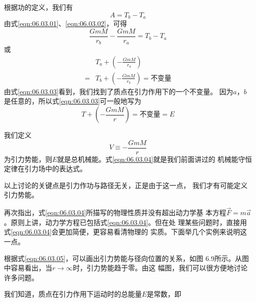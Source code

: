 \clearpage
根据功的定义，我们有
\begin{equation}\label{eqn:06.03.02}
  A = T _ { b } - T _ { a }
\end{equation}
由式\eqref{eqn:06.03.01}、\eqref{eqn:06.03.02}，可得
\begin{equation*}
  \frac { G m M } { r _ { b } } - \frac { G m M } { r _ { a } } = T _ { b } - T _ { a }
\end{equation*}
或
\begin{equation}\label{eqn:06.03.03}
  \begin{aligned}
      & T _ { a } + \left( - \frac { G m M } { r _ { a } } \right)              \\
    = & T _ { b } + \left( - \frac { G m M } { r _ { b } } \right) = \text{不变量}
  \end{aligned}
\end{equation}
由式\eqref{eqn:06.03.03}看到，我们找到了质点在引力作用下的一个不变量。
因为$ a $，$ b $是任意的，所以式\eqref{eqn:06.03.03}可一般地写为
\begin{equation}\label{eqn:06.03.04}
  T + \left( - \frac { G m M } { r } \right) = \text{不变量} = E
\end{equation}

我们定义
\begin{equation}\label{eqn:06.03.05}
  V \equiv - \frac { G m M } { r }
\end{equation}
为引力势能，则$ E $就是总机械能。式\eqref{eqn:06.03.04}就是我们前面讲过的
机械能守恒定律在引力场中的表达式。

以上讨论的关键点是引力作功与路径无关，正是由于这一点，
我们才有可能定义引力势能。

再次指出，式\eqref{eqn:06.03.04}所描写的物理性质并没有超出动力学基
本方程$ \vec{F} = m \vec{a} $。原则上讲，动力学方程已包括式\eqref{eqn:06.03.04}。但在处
理某些问题时，直接用式\eqref{eqn:06.03.04}会更加简便，更容易看清物理的
实质。下面举几个实例来说明这一点。

根据式\eqref{eqn:06.03.05}，可以画出引力势能与径向位置的关系，如图
6.9所示。从图中容易看出，当$ r \to \infty $时，引力势能趋于零。由这
幅图，我们可以很方便地讨论许多问题。

我们知道，质点在引力作用下运动时的总能量$ E $是常数，即

